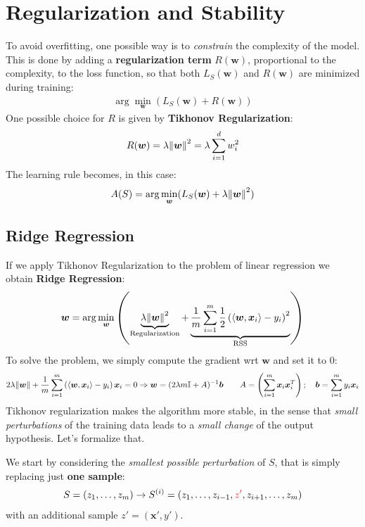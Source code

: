 \documentclass[../template.tex]{subfiles}
\begin{document}
\section{Regularization and Stability}
To avoid overfitting, one possible way is to \textit{constrain} the complexity of the model. This is done by adding a \textbf{regularization term} $R(\bm{w})$, proportional to the complexity, to the loss function, so that both $L_S(\bm{w})$ and $R(\bm{w})$ are minimized during training:
\begin{align*}
    \arg\min_{\bm{w}} (L_S(\bm{w}) + R(\bm{w}))
\end{align*} 
One possible choice for $R$ is given by \textbf{Tikhonov Regularization}:
\begin{align*}
    R(\bm{w}) = \lambda \norm{\bm{w}}^2 = \lambda \sum_{i=1}^d w_i^2
\end{align*} 
The learning rule becomes, in this case:
\begin{align*}
    A(S) = \arg\min_{\bm{w}}( L_S(\bm{w}) + \lambda\norm{\bm{w}}^2)
\end{align*}

\subsection{Ridge Regression}
If we apply Tikhonov Regularization to the problem of linear regression we obtain \textbf{Ridge Regression}:
\begin{align*}
    \bm{w} = \arg\min_{\bm{w}} \left(\underbrace{\lambda \norm{\bm{w}}^2}_{\mathrm{Regularization}}  + \underbrace{\frac{1}{m} \sum_{i=1}^m \frac{1}{2} \left( \langle \bm{w}, \bm{x}_i \rangle - y_i \right)^2 }_{\text{RSS}} \right)
\end{align*} 
To solve the problem, we simply compute the gradient wrt $\bm{w}$ and set it to $0$:
\begin{align*}
    2 \lambda \norm{\bm{w}} + \frac{1}{m} \sum_{i=1}^m \left(\langle \bm{w}, \bm{x}_i \rangle - y_i \right)\bm{x}_i = 0 \Rightarrow \bm{w} = (2 \lambda m \mathbb{I} + A )^{-1} \bm{b} \qquad A=\left(\sum_{i=1}^m \bm{x}_i \bm{x}_i^T \right); \quad \bm{b} = \sum_{i=1}^m y_i \bm{x}_i
\end{align*}  
Tikhonov regularization makes the algorithm more stable, in the sense that \textit{small perturbations} of the training data leads to a \textit{small change} of the output hypothesis. Let's formalize that.

We start by considering the \textit{smallest possible perturbation} of $S$, that is simply replacing just \textbf{one sample}:
\begin{align*}
    S=(z_1, \dots, z_m) \to S^{(i)} = (z_1, \dots, z_{i-1}, \textcolor{Red}{z'}, z_{i+1}, \dots, z_m )
\end{align*}   
with an additional sample $z' = (\bm{x'}, y')$.
\end{document}
